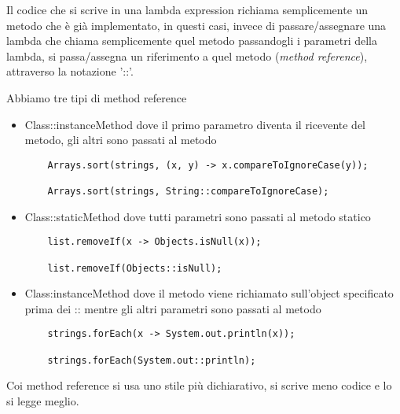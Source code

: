 Il codice che si scrive in una lambda expression richiama semplicemente un metodo che è già implementato, in questi casi, invece di passare/assegnare una lambda che 
chiama semplicemente quel metodo passandogli i parametri della lambda, si passa/assegna un riferimento a quel metodo (\textit{method reference}), attraverso la 
notazione '::'.

Abbiamo tre tipi di method reference
\begin{itemize}
    \item Class::instanceMethod dove il primo parametro diventa il ricevente del metodo, gli altri sono passati al metodo
    \begin{lstlisting}
    Arrays.sort(strings, (x, y) -> x.compareToIgnoreCase(y));

    Arrays.sort(strings, String::compareToIgnoreCase);
    \end{lstlisting}
    \item Class::staticMethod dove tutti parametri sono passati al metodo statico
    \begin{lstlisting}
    list.removeIf(x -> Objects.isNull(x));
    
    list.removeIf(Objects::isNull);
    \end{lstlisting}
    \item Class:instanceMethod dove il metodo viene richiamato sull’object specificato prima dei :: mentre gli altri parametri sono passati al metodo
    \begin{lstlisting}
    strings.forEach(x -> System.out.println(x));

    strings.forEach(System.out::println);
    \end{lstlisting}
\end{itemize}

Coi method reference si usa uno stile più dichiarativo, si scrive meno codice e lo si legge meglio.
